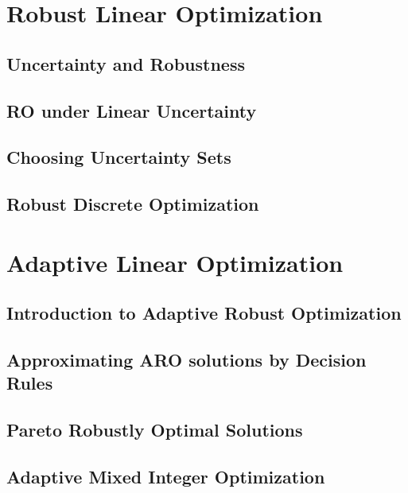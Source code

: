\documentclass{bookest}
\begin{document}
%		
%	
%	
%	
%	
%	
	

	\part{Robust Linear Optimization}
	
	\chapter{Uncertainty and Robustness} \label{chapter_1}
	
	
	\chapter{RO under Linear Uncertainty} \label{chapter3-2}
	
	
	\chapter{Choosing Uncertainty Sets} \label{chapter_3}
	
	
	\chapter{Robust Discrete Optimization} \label{chapter_3}
	
	
	\part{Adaptive Linear Optimization}
	
	\chapter{Introduction to Adaptive Robust Optimization} 
	
	
	\chapter{Approximating ARO solutions by Decision Rules} 
	
	
	\chapter{Pareto Robustly Optimal Solutions} 
	
	
	\chapter{Adaptive Mixed Integer Optimization} 
	
	
\end{document}
